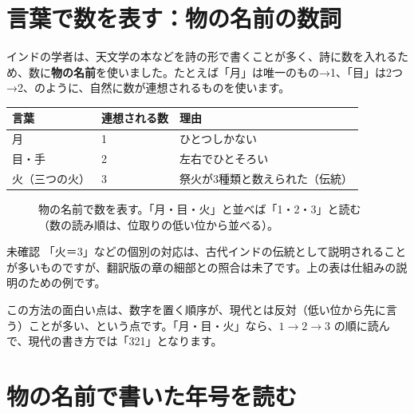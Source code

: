 \documentclass[a4paper,11pt,openany]{ltjsbook}
\begin{document}
\section{言葉で数を表す：物の名前の数詞}

インドの学者は、天文学の本などを詩の形で書くことが多く、詩に数を入れるため、数に\textbf{物の名前}を使いました。たとえば「月」は唯一のもの→1、「目」は2つ→2、のように、自然に数が連想されるものを使います。

\begin{center}
\begin{tabular}{lll}
\toprule
言葉 & 連想される数 & 理由\\
\midrule
月 & 1 & ひとつしかない\\
目・手 & 2 & 左右でひとそろい\\
火（三つの火） & 3 & 祭火が3種類と数えられた（伝統）\\
\bottomrule
\end{tabular}
\end{center}

\begin{figure}[htbp]
\centering
{}
\caption{物の名前で数を表す。「月・目・火」と並べば「1・2・3」と読む（数の読み順は、位取りの低い位から並べる）。}
\end{figure}

\begin{notebox}{未確認}
「火＝3」などの個別の対応は、古代インドの伝統として説明されることが多いものですが、翻訳版の章の細部との照合は未了です。上の表は仕組みの説明のための例です。
\end{notebox}

この方法の面白い点は、数字を置く順序が、現代とは反対（低い位から先に言う）ことが多い、という点です。「月・目・火」なら、$1\to2\to3$ の順に読んで、現代の書き方では「321」となります。

\section{物の名前で書いた年号を読む}
\end{document}
